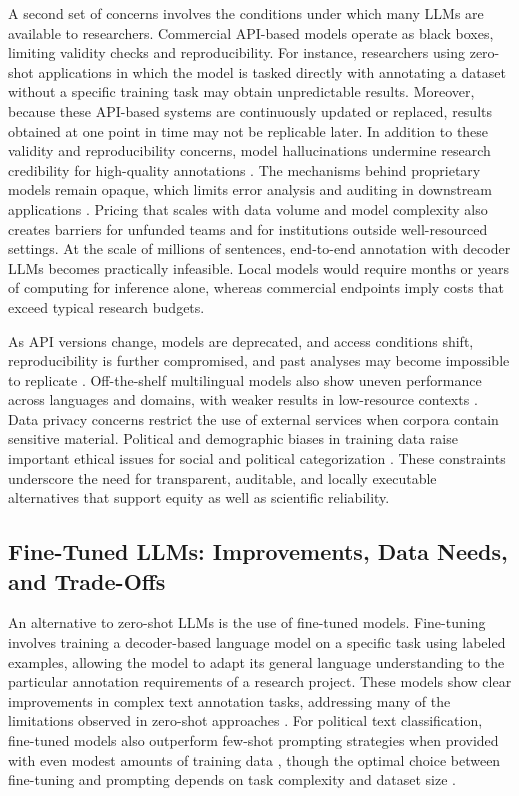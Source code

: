 \documentclass[12pt]{article}
\begin{document}
A second set of concerns involves the conditions under which many LLMs are available to researchers. Commercial API-based models operate as black boxes, limiting validity checks and reproducibility. For instance, researchers using zero-shot applications in which the model is tasked directly with annotating a dataset without a specific training task may obtain unpredictable results. Moreover, because these API-based systems are continuously updated or replaced, results obtained at one point in time may not be replicable later. In addition to these validity and reproducibility concerns, model hallucinations undermine research credibility for high-quality annotations \parencite{rateria_singh24}. The mechanisms behind proprietary models remain opaque, which limits error analysis and auditing in downstream applications \parencite{zhao_etal24}. Pricing that scales with data volume and model complexity also creates barriers for unfunded teams and for institutions outside well-resourced settings. At the scale of millions of sentences, end-to-end annotation with decoder LLMs becomes practically infeasible. Local models would require months or years of computing for inference alone, whereas commercial endpoints imply costs that exceed typical research budgets. 

As API versions change, models are deprecated, and access conditions shift, reproducibility is further compromised, and past analyses may become impossible to replicate \parencite{weber_reichardt23}. Off-the-shelf multilingual models also show uneven performance across languages and domains, with weaker results in low-resource contexts \parencite{bhat_varma23, mets_etal24}. Data privacy concerns restrict the use of external services when corpora contain sensitive material. Political and demographic biases in training data raise important ethical issues for social and political categorization \parencite{mcgee23, rozado23, dong_etal23}. These constraints underscore the need for transparent, auditable, and locally executable alternatives that support equity as well as scientific reliability.

\subsection{Fine-Tuned LLMs: Improvements, Data Needs, and Trade-Offs}

An alternative to zero-shot LLMs is the use of fine-tuned models. Fine-tuning involves training a decoder-based language model on a specific task using labeled examples, allowing the model to adapt its general language understanding to the particular annotation requirements of a research project. These models show clear improvements in complex text annotation tasks, addressing many of the limitations observed in zero-shot approaches \parencite{alizadeh_etal24a, halterman_keith25}. For political text classification, fine-tuned models also outperform few-shot prompting strategies when provided with even modest amounts of training data \parencite{alizadeh_etal24a, wang_etal24}, though the optimal choice between fine-tuning and prompting depends on task complexity and dataset size \parencite{chen_etal23}.
\end{document}
